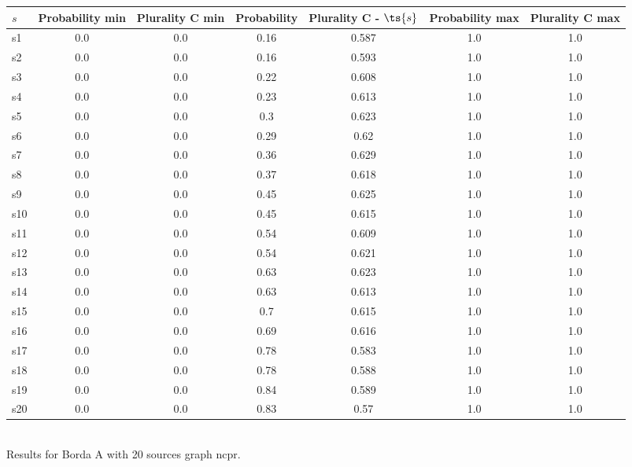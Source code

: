 \documentclass{article}
\begin{document}
\noindent\begin{tabular}{|l|c|c|c|c|c|c|}
\hline
$s$& Probability min & Plurality C min & Probability & Plurality C - $\ts{s}$ & Probability max & Plurality C max\\
\hline
s1 &0.0 & 0.0 & 0.16 & 0.587 & 1.0 & 1.0\\
\hline
s2 &0.0 & 0.0 & 0.16 & 0.593 & 1.0 & 1.0\\
\hline
s3 &0.0 & 0.0 & 0.22 & 0.608 & 1.0 & 1.0\\
\hline
s4 &0.0 & 0.0 & 0.23 & 0.613 & 1.0 & 1.0\\
\hline
s5 &0.0 & 0.0 & 0.3 & 0.623 & 1.0 & 1.0\\
\hline
s6 &0.0 & 0.0 & 0.29 & 0.62 & 1.0 & 1.0\\
\hline
s7 &0.0 & 0.0 & 0.36 & 0.629 & 1.0 & 1.0\\
\hline
s8 &0.0 & 0.0 & 0.37 & 0.618 & 1.0 & 1.0\\
\hline
s9 &0.0 & 0.0 & 0.45 & 0.625 & 1.0 & 1.0\\
\hline
s10 &0.0 & 0.0 & 0.45 & 0.615 & 1.0 & 1.0\\
\hline
s11 &0.0 & 0.0 & 0.54 & 0.609 & 1.0 & 1.0\\
\hline
s12 &0.0 & 0.0 & 0.54 & 0.621 & 1.0 & 1.0\\
\hline
s13 &0.0 & 0.0 & 0.63 & 0.623 & 1.0 & 1.0\\
\hline
s14 &0.0 & 0.0 & 0.63 & 0.613 & 1.0 & 1.0\\
\hline
s15 &0.0 & 0.0 & 0.7 & 0.615 & 1.0 & 1.0\\
\hline
s16 &0.0 & 0.0 & 0.69 & 0.616 & 1.0 & 1.0\\
\hline
s17 &0.0 & 0.0 & 0.78 & 0.583 & 1.0 & 1.0\\
\hline
s18 &0.0 & 0.0 & 0.78 & 0.588 & 1.0 & 1.0\\
\hline
s19 &0.0 & 0.0 & 0.84 & 0.589 & 1.0 & 1.0\\
\hline
s20 &0.0 & 0.0 & 0.83 & 0.57 & 1.0 & 1.0\\
\hline
\end{tabular}\\

\noindent Results for Borda A with 20 sources graph ncpr.
\end{document}
